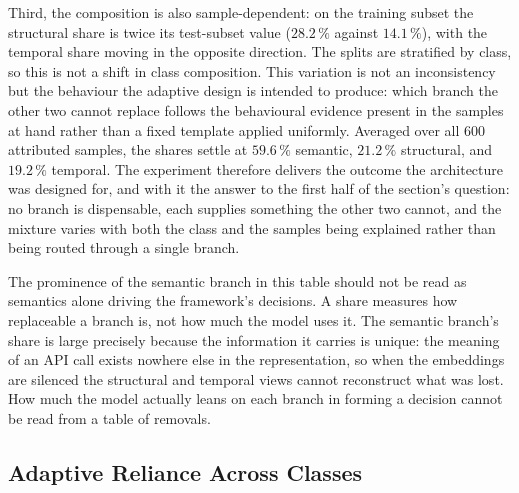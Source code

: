 \documentclass[%
    BCOR=10mm,
    DIV=13,
    toc=bibliography,
    toc=listof,
    oneside,
    12pt,
]{scrbook}
\begin{document}
Third, the composition is also sample-dependent: on the training subset the
structural share is twice its test-subset value ($28.2\,\%$ against
$14.1\,\%$), with the temporal share moving in the opposite direction. The
splits are stratified by class, so this is not a shift in class composition.
This variation is not an inconsistency but the behaviour
the adaptive design is intended to produce: which branch the other two cannot
replace follows the behavioural evidence present in the samples at hand rather
than a fixed template applied uniformly. Averaged over all $600$ attributed
samples, the shares settle at $59.6\,\%$ semantic, $21.2\,\%$ structural, and
$19.2\,\%$ temporal. The experiment therefore delivers the outcome the
architecture was designed for, and with it the answer to the first half of the
section's question: no branch is dispensable, each supplies something the other
two cannot, and the mixture varies with both the class and the samples being
explained rather than being routed through a single branch.

The prominence of the semantic branch in this table should not be read as
semantics alone driving the framework's decisions. A share measures how
replaceable a branch is, not how much the model uses it. The semantic branch's
share is large precisely because the
information it carries is unique: the meaning of an API call exists nowhere
else in the representation, so when the embeddings are silenced the structural
and temporal views cannot reconstruct what was lost. How much the model
actually leans on each branch in forming a decision cannot be read from a table
of removals.

\subsection{Adaptive Reliance Across Classes}
\label{subsec:branch_specialisation}
\end{document}
